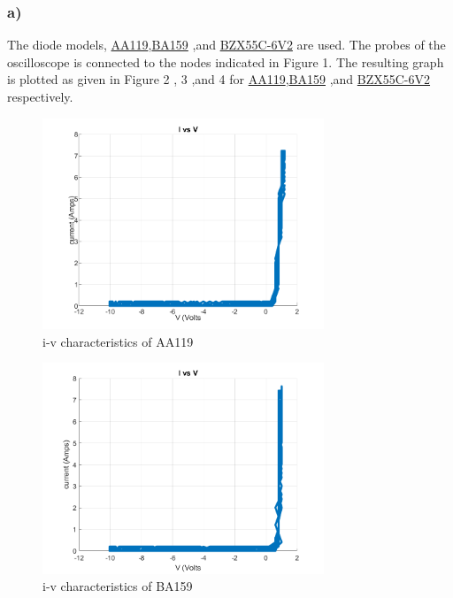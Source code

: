 \documentclass[letterpaper,12pt]{article}
\begin{document}
\subsubsection{a)}
The diode models, \href{https://logosfoundation.org/elektron/mixers/AA119.pdf}{AA119},\href{https://www.vishay.com/docs/88536/ba157.pdf}{BA159}  ,and \href{https://www.vishay.com/docs/85604/bzx55.pdf}{BZX55C-6V2} are used. The probes of the oscilloscope is connected to the nodes indicated in Figure 1. The resulting graph is plotted as given in Figure 2 , 3 ,and 4 for \href{https://logosfoundation.org/elektron/mixers/AA119.pdf}{AA119},\href{https://www.vishay.com/docs/88536/ba157.pdf}{BA159}  ,and \href{https://www.vishay.com/docs/85604/bzx55.pdf}{BZX55C-6V2} respectively.

\begin{figure}[H]
    \centering
    \includegraphics[width = 0.75\textwidth]{1_aa119.png}
    \caption{i-v characteristics of AA119}
\end{figure} 


\begin{figure}[H]
    \centering
    \includegraphics[width = 0.75\textwidth]{1_ba159.png}
    \caption{i-v characteristics of BA159}
\end{figure} 
\end{document}
